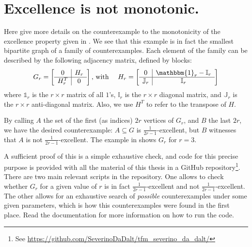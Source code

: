\vfill\newpage \section{Excellence is not monotonic.} \label{sec:excellence_is_not_monotonic}
    Here give more details on the counterexample to the monotonicity of the excellence property given in
    .
    We see that this example is in fact the smallest bipartite graph of a family of counterexamples.
    Each element of the family can be described by the following adjacency matrix, defined by blocks:
    \[
        G_r = \left[
            \begin{array}{c|c}
                0 & H_r \\
                \hline
                H_r^T & 0 \\
            \end{array}
        \right]
        \text{, with }\quad
        H_r = \left[
            \begin{array}{c|c}
                0 & \mathbbm{1}_r - \mathbb{I}_r \\
                \hline
                \mathbb{J}_r & \mathbb{I}_r \\
            \end{array}
        \right]
    \]
    where $\mathds{1}_r$ is the $r \times r$ matrix of all $1$'s,
    $\mathbb{I}_r$ is the $r \times r$ diagonal matrix,
    and $\mathbb{J}_r$ is the $r \times r$ anti-diagonal matrix.
    Also, we use $H^T$ to refer to the transpose of $H$.

    By calling $A$ the set of the first (as indices) $2r$ vertices of $G_r$, and $B$ the last $2r$,
    we have the desired counterexample:
    $A \subseteq G$ is $\frac{1}{2r-1}$-excellent, but $B$ witnesses that $A$ is not $\frac{1}{2r-1}$-excellent.
    The example in  shows $G_r$ for $r=3$.

    A sufficient proof of this is a simple exhaustive check, and code for this precise purpose is provided with all
    the material of this thesis in a GitHub repository\footnote{See \url{https://github.com/SeverinoDaDalt/tfm_severino_da_dalt/}}.
    There are two main relevant scripts in the repository.
    One allows to check whether $G_r$ for a given value of $r$ is in fact $\frac{1}{2r-1}$-excellent and not
    $\frac{1}{2r-1}$-excellent.
    The other allows for an exhaustive search of \emph{possible} counterexamples under some given parameters, which is how this
    counterexamples were found in the first place.
    Read the documentation for more information on how to run the code.